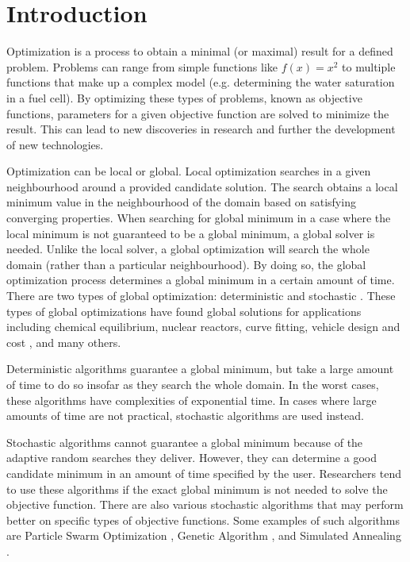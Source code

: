 
\chapter{Introduction}
\label{introduction}

Optimization is a process to obtain a minimal (or maximal) result for a defined problem. Problems can range from simple functions like $f(x) = x^2$ to multiple functions that make up a complex model (e.g. determining the water saturation in a fuel cell). By optimizing these types of problems, known as objective functions, parameters for a given objective function are solved to minimize the result. This can lead to new discoveries in research and further the development of new technologies.

Optimization can be local or global. Local optimization searches in a given neighbourhood around a provided candidate solution. The search obtains a local minimum value in the neighbourhood of the domain based on satisfying converging properties. When searching for global minimum in a case where the local minimum is not guaranteed to be a global minimum, a global solver is needed. Unlike the local solver, a global optimization will search the whole domain (rather than a particular neighbourhood). By doing so, the global optimization process determines a global minimum in a certain amount of time. There are two types of global optimization: deterministic and stochastic \cite{Liberti2000}. These types of global optimizations have found global solutions for  applications including chemical equilibrium, nuclear reactors, curve fitting, vehicle design and cost \cite{Pinter2002}, and many others.

Deterministic algorithms guarantee a global minimum, but take a large amount of time to do so insofar as they search the whole domain. In the worst cases, these algorithms have complexities of exponential time. In cases where large amounts of time are not practical, stochastic algorithms are used instead. 

Stochastic algorithms cannot guarantee a global minimum because of the adaptive random searches they deliver. However, they can determine a good candidate minimum in an amount of time specified by the user. Researchers tend to use these algorithms if the exact global minimum is not needed to solve the objective function. There are also various stochastic algorithms that may perform better on specific types of objective functions. Some examples of such algorithms are Particle Swarm Optimization \cite{Kennedy}, Genetic Algorithm \cite{}, and Simulated Annealing \cite{}. 

